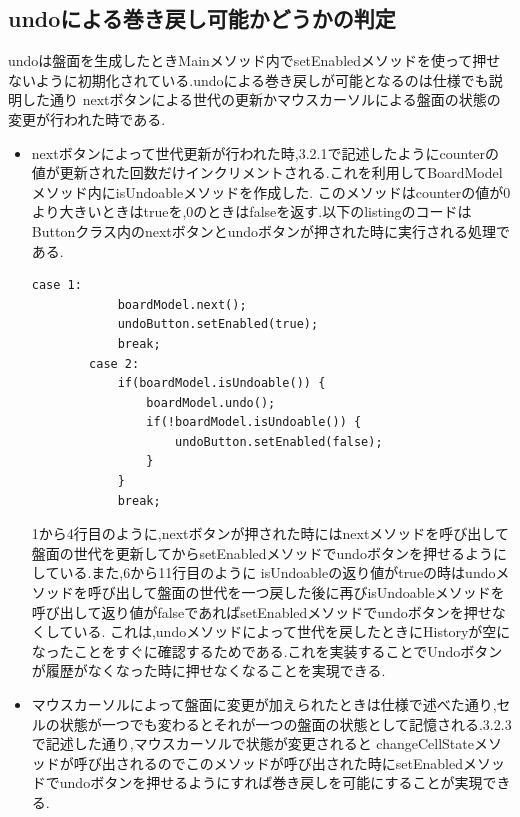 \documentclass[dvipdfmx]{jarticle}
\begin{document}
\subsection{undoによる巻き戻し可能かどうかの判定}
undoは盤面を生成したときMainメソッド内でsetEnabledメソッドを使って押せないように初期化されている.undoによる巻き戻しが可能となるのは仕様でも説明した通り
nextボタンによる世代の更新かマウスカーソルによる盤面の状態の変更が行われた時である.
\begin{itemize}
    \item nextボタンによって世代更新が行われた時,3.2.1で記述したようにcounterの値が更新された回数だけインクリメントされる.これを利用してBoardModelメソッド内にisUndoableメソッドを作成した.
    このメソッドはcounterの値が0より大きいときはtrueを,0のときはfalseを返す.以下のlistingのコードはButtonクラス内のnextボタンとundoボタンが押された時に実行される処理である.
    \begin{lstlisting}[caption=nextボタン及びundoボタンを押したときに実行される処理,label=fuga]
        case 1:
            boardModel.next();
            undoButton.setEnabled(true);
            break;
        case 2:
            if(boardModel.isUndoable()) {
                boardModel.undo();
                if(!boardModel.isUndoable()) {
                    undoButton.setEnabled(false);
                }
            }
            break;
    \end{lstlisting}
    1から4行目のように,nextボタンが押された時にはnextメソッドを呼び出して盤面の世代を更新してからsetEnabledメソッドでundoボタンを押せるようにしている.また,6から11行目のように
    isUndoableの返り値がtrueの時はundoメソッドを呼び出して盤面の世代を一つ戻した後に再びisUndoableメソッドを呼び出して返り値がfalseであればsetEnabledメソッドでundoボタンを押せなくしている.
    これは,undoメソッドによって世代を戻したときにHistoryが空になったことをすぐに確認するためである.これを実装することでUndoボタンが履歴がなくなった時に押せなくなることを実現できる.
    \item マウスカーソルによって盤面に変更が加えられたときは仕様で述べた通り,セルの状態が一つでも変わるとそれが一つの盤面の状態として記憶される.3.2.3で記述した通り,マウスカーソルで状態が変更されると
    changeCellStateメソッドが呼び出されるのでこのメソッドが呼び出された時にsetEnabledメソッドでundoボタンを押せるようにすれば巻き戻しを可能にすることが実現できる.
\end{itemize}
\end{document}
